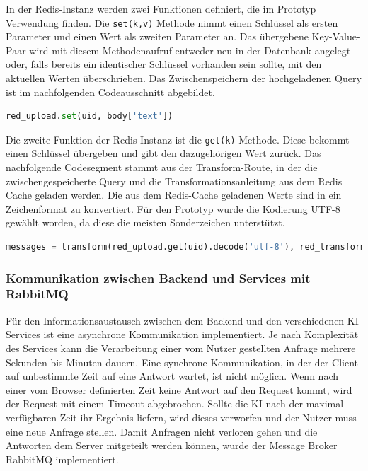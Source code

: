 In der Redis-Instanz werden zwei Funktionen definiert, die im Prototyp Verwendung finden. Die \texttt{set(k,v)} Methode nimmt einen Schlüssel als ersten Parameter und einen Wert als zweiten Parameter an. Das übergebene Key-Value-Paar wird mit diesem Methodenaufruf entweder neu in der Datenbank angelegt oder, falls bereits ein identischer Schlüssel vorhanden sein sollte, mit den aktuellen Werten überschrieben. Das Zwischenspeichern der hochgeladenen Query ist im nachfolgenden Codeausschnitt abgebildet.  

\begin{lstlisting}[language=Python, caption={Set-Funktion aus Redis}]
red_upload.set(uid, body['text'])
\end{lstlisting}

Die zweite Funktion der Redis-Instanz ist die \texttt{get(k)}-Methode. Diese bekommt einen Schlüssel übergeben und gibt den dazugehörigen Wert zurück. Das nachfolgende Codesegment stammt aus der Transform-Route, in der die zwischengespeicherte Query und die Transformationsanleitung aus dem Redis Cache geladen werden. Die aus dem Redis-Cache geladenen Werte sind in ein Zeichenformat zu konvertiert. Für den Prototyp wurde die Kodierung UTF-8 gewählt worden, da diese die meisten Sonderzeichen unterstützt.

\begin{lstlisting}[language=Python, caption={Get-Funktion aus Redis}]
messages = transform(red_upload.get(uid).decode('utf-8'), red_transform.get(uid))
\end{lstlisting}

\subsubsection{Kommunikation zwischen Backend und Services mit RabbitMQ}
Für den Informationsaustausch zwischen dem Backend und den verschiedenen KI-Services ist eine asynchrone Kommunikation implementiert. Je nach Komplexität des Services kann die Verarbeitung einer vom Nutzer gestellten Anfrage mehrere Sekunden bis Minuten dauern. Eine synchrone Kommunikation, in der der Client auf unbestimmte Zeit auf eine Antwort wartet, ist nicht möglich. Wenn nach einer vom Browser definierten Zeit keine Antwort auf den Request kommt, wird der Request mit einem Timeout abgebrochen. Sollte die KI nach der maximal verfügbaren Zeit ihr Ergebnis liefern, wird dieses verworfen und der Nutzer muss eine neue Anfrage stellen. Damit Anfragen nicht verloren gehen und die Antworten dem Server mitgeteilt werden können, wurde der Message Broker RabbitMQ implementiert. 


